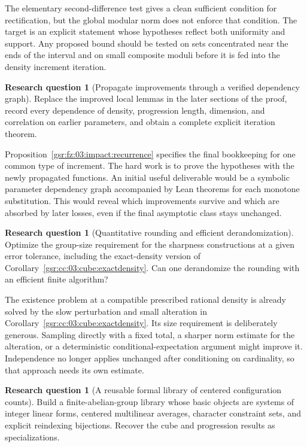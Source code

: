 \documentclass[11pt,letterpaper]{article}
\numberwithin{equation}{section}
\theoremstyle{definition}
\newtheorem{problem}[theorem]{Research question}
\theoremstyle{remark}
\newcommand{\1}{\mathbf 1}
\begin{document}
The elementary second-difference test gives a clean sufficient condition
for rectification, but the global modular norm does not enforce that
condition. The target is an explicit statement whose hypotheses reflect
both uniformity and support. Any proposed bound should be tested on
sets concentrated near the ends of the interval and on small composite
moduli before it is fed into the density increment iteration.

\begin{problem}[Propagate improvements through a verified dependency graph]
Replace the improved local lemmas in the later sections of the proof,
record every dependence of density, progression length, dimension, and
correlation on earlier parameters, and obtain a complete explicit
iteration theorem.
\end{problem}

Proposition~\ref{gsr:fz:03:impact:recurrence} specifies the final bookkeeping for
one common type of increment. The hard work is to prove the hypotheses
with the newly propagated functions. An initial useful deliverable would
be a symbolic parameter dependency graph accompanied by Lean theorems
for each monotone substitution. This would reveal which improvements
survive and which are absorbed by later losses, even if the final
asymptotic class stays unchanged.

\begin{problem}[Quantitative rounding and efficient derandomization]
Optimize the group-size requirement for the sharpness constructions at
a given error tolerance, including the exact-density version of
Corollary~\ref{gsr:cc:03:cube:exactdensity}. Can one derandomize the rounding with
an efficient finite algorithm?
\end{problem}

The existence problem at a compatible prescribed rational density is
already solved by the slow perturbation and small alteration in
Corollary~\ref{gsr:cc:03:cube:exactdensity}. Its size requirement is deliberately
generous. Sampling directly with a fixed total, a sharper norm estimate
for the alteration, or a deterministic conditional-expectation argument
might improve it. Independence no longer applies unchanged after
conditioning on cardinality, so that approach needs its own estimate.

\begin{problem}[A reusable formal library of centered configuration counts]
Build a finite-abelian-group library whose basic objects are systems of
integer linear forms, centered multilinear averages, character constraint
sets, and explicit reindexing bijections. Recover the cube and progression
results as specializations.
\end{problem}
\end{document}
